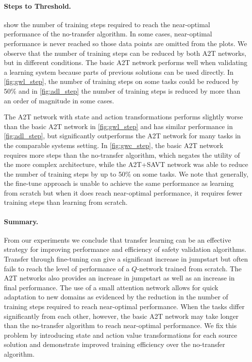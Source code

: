 \paragraph{Steps to Threshold.}
 show the number of training steps required to reach the near-optimal performance of the no-transfer algorithm. In some cases, near-optimal performance is never reached so those data points are omitted from the plots.  We observe that the number of training steps can be reduced by both A2T networks, but in different conditions. The basic A2T network performs well when validating a learning system because parts of previous solutions can be used directly. In \cref{fig:gwl_step}, the number of training steps on some tasks could be reduced by \num{50}\% and in \cref{fig:adl_step} the number of training steps is reduced by more than an order of magnitude in some cases.  

The A2T network with state and action transformations performs slightly worse than the basic A2T network in \cref{fig:gwl_step} and has similar performance in \cref{fig:adl_step}, but significantly outperforms the A2T network for many tasks in the comparable systems setting. In \cref{fig:gwc_step}, the basic A2T network requires more steps than the no-transfer algorithm, which negates the utility of the more complex architecture, while the A2T+SAVT network was able to reduce the number of training steps by up to \num{50}\% on some tasks. We note that generally, the fine-tune approach is unable to achieve the same performance as learning from scratch but when it does reach near-optimal performance, it requires fewer training steps than learning from scratch.

\paragraph{Summary.} From our experiments we conclude that transfer learning can be an effective strategy for improving performance and efficiency of safety validation algorithms. Transfer through fine-tuning can give a significant increase in jumpstart but often fails to reach the level of performance of a $Q$-network trained from scratch. The A2T networks also provides an increase in jumpstart as well as an increase in final performance. The use of a small attention network allows for quick adaptation to new domains as evidenced by the reduction in the number of training steps required to reach near-optimal performance. When the tasks differ significantly from each other, however, the basic A2T network may take longer than the no-transfer algorithm to reach near-optimal performance. We fix this problem by introducing state and action value transformations for each source solution and demonstrate improved training efficiency over the no-transfer algorithm.


